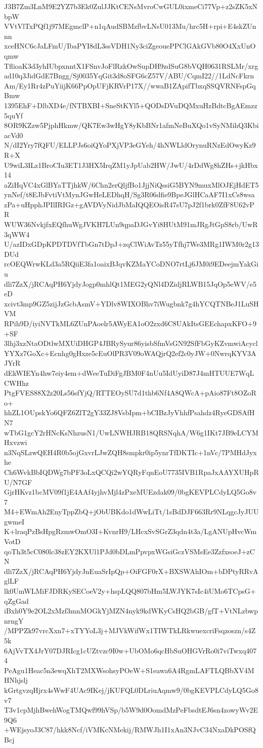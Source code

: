 J3B7Zm3LnM9E2YZ7b3Ek0ZulJJKtCENsMvroCwGUL0ixmeCi77Vp+z2sZK5xNbpW
VVtVlTxPQf1j97MEgmclP+n1qAudSBMzfbvLNsU013Mu/hrc5H+rpi+E4skZUnnn
xceHNC6cJaLFmU/IbaPYI8dL3ssVDH1Ny3ciZgeouePPClGAkGVb80O4XxUnOqmw
TflioaK3d3yhIUbpxnntX1FSnvJoFlRzkOwSupDH9zdSuG8bVQH0631RSLMr/xrg
ad10q3JidGdE7Bngg/Sj0035YqGit3d8oSFG6cZ57V/ABU/CqmI22//1LdNcFkrn
Am/Ey1Rr4zPuYiijK66PpOpUFjKRVrP17X//wwaB1ZApifTbxqSSQVRNFspGqBmw
1395EhF+DlbXD4e/fNTBXBI+SneStKYl5+QODsDVuDQMxuHzBdtcBgAEmzz5quYf
8OR9KZzw5PjphHkmw/QK7Ew3wHgY8yKbBNr1afmNeBuXQo1vSyNMihQ3KbiacVd0
N/dI2Yry7fQFU/ELLPJs6oiQYoPXjVP3eGYeh/4hNWLldOrynuRNzEdOwyKz9R+X
U9wiL3ILz1BroCIu3ET1J3HX5IrqZM1yJpUab2HW/JwU/4rDdWg8hZHs+jkHbx14
aZiHqVC4xGlBYaTTjhkW/6Chn2erQljfBo1JjjNiQssiG5BYN9muxMlOJEjHdET5
ynNef/t8EJbFvtiVtMynJGwHeLEDhqH/Sg3R06dfie9BpeJGlHCaAF7I1xCs8wsa
zPa+uHpphJPIlIRIGz+gAVDVyNidJbMaIQQEOisR47sU7pJ2f1brk0ZfF8U62vPR
WUW36NvkjfxEQfhuWgJVKH7LUn9qpaDJGvYi8HUtM91mJRgJtGpS8rb/UwR3qWW4
U/azIDxGDpKPDTDVfTbGn7tDpJ+zqClWiAvTz55yTfhj7We3MRg1IWM0r2g13DUd
rcOEQWrwKLd3a5RQiiE3fa1oaixBJqvKZMaYCoDNO7rtLj6JM0i9EDeejmYakGiu
dli7ZzX/jRCAqPH6YjdyJogp0mhlQt1MEG2yQNl4DZidjRLWB15JqOp5eWV/e5eD
xcivt3mp9GZ5zijJzGcbAsmV+YDlv8WIXOBhv7iWugbnk7g4hYCQTNBeJ1LuSHVM
RPih9D/iyiNVTkML6ZUnPAoelr5AWyEA1oO2zxd6C8UAkItsGEEchapxKFO+9+SF
3lhj3xzNtaODtlwMXUiDHGP4JBRySyur86yisbSfmVsGN92SfFbGyKZvmwiAcycl
YYXz7GoXc+Ecnhg0gHxze5cEuOlPR3V09oWAQjrQ2ef2c0yJW+0NwrqKYV3AJYrR
dEkWIEYn4hw7eiy4em+dWeeTuDiFgJBM0F4nUu5IdUyiD87J4mHTUUE7WqLCWHhz
PtgFVES88X2z20Ls56sfYjQ/RTTEOySU7d1thb6Nf4A8QWcA+pAio87Ft8OZoRo+
hhZL1OUpskYo6QFZ6ZlT2gY33ZJ8VsbIpm+bCIBzJyVhhfPsahdz4RyeGDSAfHN7
wTbG1gcY2rHNcKsNhzusN1/UwLNWHJRB18QRSNqhA/W6g1IKt7JB9eLCYMHxvzwi
n3NqSLzwQEH4R0b5ojGxvrLJwZQH8smpkr0ip5ynrTfDKTIc+1nVc/7PMHdJyxhe
Ch6WvkBbIQDWg7bPF3oLxQCQi2wYQRyFqnEoU7735IVB1RpaJxAAYXUHpRU/N7GF
GjrHKvz1bcMV09f1jE4AAf4yjhvMjl4zPxeMUEzdak09/0bgKEVPLCdyLQ5Go8v7
M4+EWmAh2EnyTppZbQ+jObUBKdo1dWwLiTt/1sBdDJF663Rr9NLqgcJyJUUgwmeI
K+lraqPzBsHpgRzmwOmO3I+KvnrH9/LHcxSvSGrZ3qdn4t3a/LgANUpHvcWmVotD
qoTh3t5cC080lc38zEY2KXUl1PJd0bDLmPpvpxWGsiGczVSMsEe3ZzfxsoeJ+zCN
dli7ZzX/jRCAqPH6YjdyJnEuaSrIpQp+OiFGF0rX+BXSWAhIOm+bDPtyRRvAglLF
lk0UmWLMiFJDRKySECoeV2y+hspLQQ807bHm5LWJYK7sIc4iUMo6TCpsG+qZgGad
iBxh0Y9e2OL2xMzf3mnMOGkYjMZN4nyk9kdWKyCsHQ2bGB/gfT+VtNLzbwpnrngY
/MPPZk97vrcXxn7+xTYYoL3j+MJVkWifWx1TIWTkLRkwuexcriFsqzoszn/s4Z5k
6AjVvTX4JrY07DJRIcg1cUZtvzc9I0w+UbOMo6qcHbSuOHGVrRo0i7viTwxq4074
PeAgu1Heac5n3ewqXhT2MXWsohsyPOeW+S1eawa6A4RgmLAFTLQBbXV4MHNhjslj
kGrtgvzqHjrx4sWwF4UAc9IKej/jKUFQL0DLriuAqmw9/0bgKEVPLCdyLQ5Go8v7
T3v1cpMjhBwehWogTMQwf99hVSp/b5W9d0OomdMzPeFbsdtEJ6sn4zowyWv2E9Q6
+WEjsyoJ3C87/hkk8Ncf/iVMKcNMekij/RMWJh1I1xAn3NJvC34NxaDkPOSfQBcj
